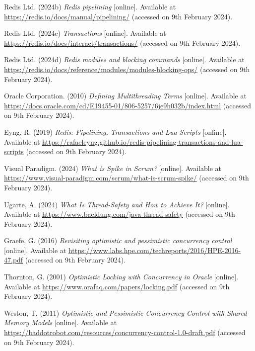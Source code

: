 \noindent Redis Ltd. (2024b) \textit{Redis pipelining} [online]. Available at \url{https://redis.io/docs/manual/pipelining/} (accessed on 9th February 2024).
\vspace{0.2cm}

\noindent Redis Ltd. (2024c) \textit{Transactions} [online]. Available at \url{https://redis.io/docs/interact/transactions/} (accessed on 9th February 2024).
\vspace{0.2cm}

\noindent Redis Ltd. (2024d) \textit{Redis modules and blocking commands} [online]. Available at \url{https://redis.io/docs/reference/modules/modules-blocking-ops/} (accessed on 9th February 2024).
\vspace{0.2cm}

\noindent Oracle Corporation. (2010) \textit{Defining Multithreading Terms} [online]. Available at \url{https://docs.oracle.com/cd/E19455-01/806-5257/6je9h032b/index.html} (accessed on 9th February 2024).
\vspace{0.2cm}

\noindent Eyng, R. (2019) \textit{Redis: Pipelining, Transactions and Lua Scripts} [online]. Available at \url{https://rafaeleyng.github.io/redis-pipelining-transactions-and-lua-scripts} (accessed on 9th February 2024).
\vspace{0.2cm}

\noindent Visual Paradigm. (2024) \textit{What is Spike in Scrum?} [online]. Available at \url{https://www.visual-paradigm.com/scrum/what-is-scrum-spike/} (accessed on 9th February 2024).
\vspace{0.2cm}

\noindent Ugarte, A. (2024) \textit{What Is Thread-Safety and How to Achieve It?} [online]. Available at \url{https://www.baeldung.com/java-thread-safety} (accessed on 9th February 2024).
\vspace{0.2cm}

\noindent Graefe, G. (2016) \textit{Revisiting optimistic and pessimistic concurrency control} [online]. Available at \url{https://www.labs.hpe.com/techreports/2016/HPE-2016-47.pdf} (accessed on 9th February 2024).
\vspace{0.2cm}

\noindent Thornton, G. (2001) \textit{Optimistic Locking with Concurrency in Oracle} [online]. Available at \url{https://www.orafaq.com/papers/locking.pdf} (accessed on 9th February 2024).
\vspace{0.2cm}

\noindent Weston, T. (2011) \textit{Optimistic and Pessimistic Concurrency Control with Shared Memory Models} [online]. Available at \url{https://baddotrobot.com/resources/concurrency-control-1.0-draft.pdf} (accessed on 9th February 2024).
\vspace{0.2cm}

